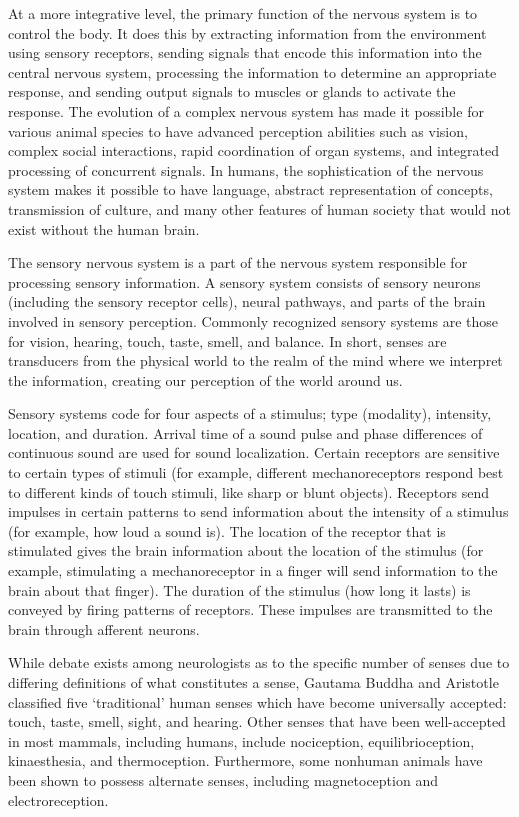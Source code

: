At a more integrative level, the primary function of the nervous system is to control the body. It does this by extracting information from the environment using sensory receptors, sending signals that encode this information into the central nervous system, processing the information to determine an appropriate response, and sending output signals to muscles or glands to activate the response. The evolution of a complex nervous system has made it possible for various animal species to have advanced perception abilities such as vision, complex social interactions, rapid coordination of organ systems, and integrated processing of concurrent signals. In humans, the sophistication of the nervous system makes it possible to have language, abstract representation of concepts, transmission of culture, and many other features of human society that would not exist without the human brain.

The sensory nervous system is a part of the nervous system responsible for processing sensory information. A sensory system consists of sensory neurons (including the sensory receptor cells), neural pathways, and parts of the brain involved in sensory perception. Commonly recognized sensory systems are those for vision, hearing, touch, taste, smell, and balance. In short, senses are transducers from the physical world to the realm of the mind where we interpret the information, creating our perception of the world around us.

Sensory systems code for four aspects of a stimulus; type (modality), intensity, location, and duration. Arrival time of a sound pulse and phase differences of continuous sound are used for sound localization. Certain receptors are sensitive to certain types of stimuli (for example, different mechanoreceptors respond best to different kinds of touch stimuli, like sharp or blunt objects). Receptors send impulses in certain patterns to send information about the intensity of a stimulus (for example, how loud a sound is). The location of the receptor that is stimulated gives the brain information about the location of the stimulus (for example, stimulating a mechanoreceptor in a finger will send information to the brain about that finger). The duration of the stimulus (how long it lasts) is conveyed by firing patterns of receptors. These impulses are transmitted to the brain through afferent neurons.

While debate exists among neurologists as to the specific number of senses due to differing definitions of what constitutes a sense, Gautama Buddha and Aristotle classified five `traditional' human senses which have become universally accepted: touch, taste, smell, sight, and hearing. Other senses that have been well-accepted in most mammals, including humans, include nociception, equilibrioception, kinaesthesia, and thermoception. Furthermore, some nonhuman animals have been shown to possess alternate senses, including magnetoception and electroreception.

